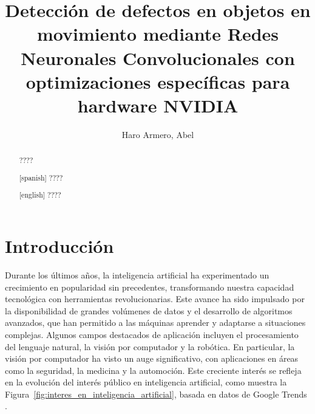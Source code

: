 \documentclass[11pt,spanish,listoffigures,listoftables]{tfgetsinf}
\title{Detección de defectos en objetos en movimiento mediante Redes Neuronales Convolucionales con optimizaciones específicas para hardware NVIDIA}
\author{Haro Armero, Abel}
\begin{document}

\begin{abstract}
????
\end{abstract}
\begin{abstract}[spanish]
????
\end{abstract}
\begin{abstract}[english]
????
\end{abstract}


\mainmatter


\chapter{Introducci\'on}
Durante los últimos años, la inteligencia artificial ha experimentado un crecimiento en popularidad sin precedentes, transformando nuestra capacidad tecnológica con herramientas revolucionarias. Este avance ha sido impulsado por la disponibilidad de grandes volúmenes de datos y el desarrollo de algoritmos avanzados, que han permitido a las máquinas aprender y adaptarse a situaciones complejas. Algunos campos destacados de aplicación incluyen el procesamiento del lenguaje natural, la visión por computador y la robótica. En particular, la visión por computador ha visto un auge significativo, con aplicaciones en áreas como la seguridad, la medicina y la automoción. Este creciente interés se refleja en la evolución del interés público en inteligencia artificial, como muestra la Figura~\ref{fig:interes_en_inteligencia_artificial}, basada en datos de Google Trends \cite{googletrends2025}.
\end{document}
